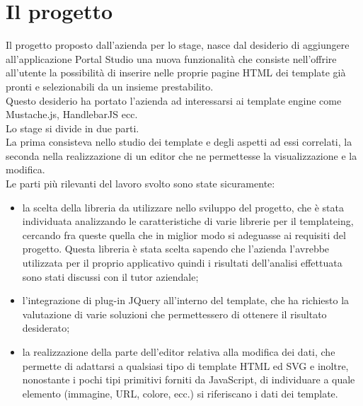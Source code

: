 \section{Il progetto}
Il progetto proposto dall'azienda per lo stage, nasce dal desiderio di aggiungere all'applicazione Portal Studio una nuova funzionalità che consiste nell'offrire all'utente la possibilità di inserire nelle proprie pagine HTML dei template già pronti e selezionabili da un insieme prestabilito.\\
Questo desiderio ha portato l'azienda ad interessarsi ai template engine come Mustache.js, HandlebarJS ecc.\\
Lo stage si divide in due parti.\\
La prima consisteva nello studio dei template e degli aspetti ad essi correlati, la seconda nella realizzazione di un editor che ne permettesse la visualizzazione e la modifica.\\
Le parti più rilevanti del lavoro svolto sono state sicuramente:
\begin{itemize}
	\item la scelta della libreria da utilizzare nello sviluppo del progetto, che è stata individuata analizzando le caratteristiche di varie librerie per il templateing, cercando fra queste quella che in miglior modo si adeguasse ai requisiti del progetto.
	Questa libreria è stata scelta sapendo che l'azienda l'avrebbe utilizzata per il proprio applicativo quindi i risultati dell'analisi effettuata sono stati discussi con il tutor aziendale;
	
	\item l'integrazione di plug-in JQuery all'interno del template, che ha richiesto la valutazione di varie soluzioni che permettessero di ottenere il risultato desiderato;
	
	\item la realizzazione della parte dell'editor relativa alla modifica dei dati, che permette di adattarsi a qualsiasi tipo di template HTML ed SVG e inoltre, nonostante i pochi tipi primitivi forniti da JavaScript, di individuare a quale elemento (immagine, URL, colore, ecc.) si riferiscano i dati dei template.
	  
\end{itemize}
